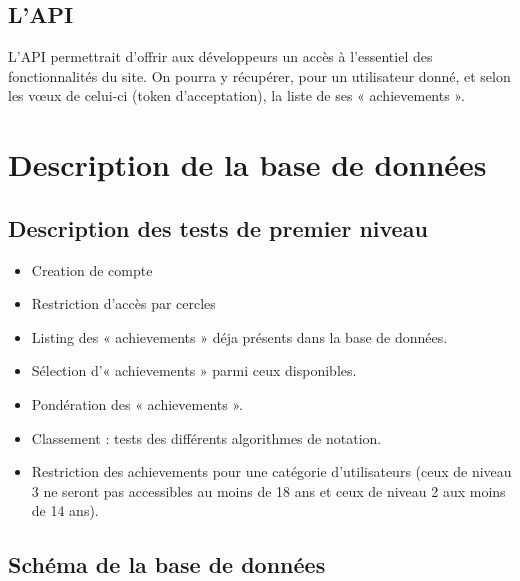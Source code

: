 \documentclass{life-fr}
\begin{document}
\section{L'API}

L'API permettrait d'offrir aux développeurs un accès à l'essentiel des fonctionnalités du site. On pourra y récupérer, pour un utilisateur donné, et selon les vœux de celui-ci (token d'acceptation), la liste de ses « achievements ».


\chapter{Description de la base de données}

\section{Description des tests de premier niveau}

\begin{itemize}
  \item{Creation de compte}
  \item {Restriction d’accès par cercles}
  \item Listing des « achievements » déja présents dans la base de données.
  \item Sélection d’« achievements » parmi ceux disponibles.
  \item Pondération des « achievements ».
  \item Classement : tests des différents algorithmes de notation.
  \item Restriction des achievements pour une catégorie d’utilisateurs (ceux de niveau 3 ne seront pas accessibles au moins de 18 ans et ceux de niveau 2 aux moins de 14 ans).
\end{itemize}

\section{Schéma de la base de données}
\end{document}
